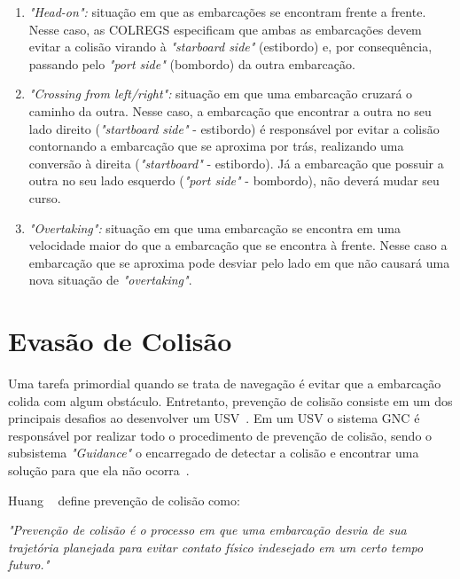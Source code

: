         \begin{enumerate}
            \item \textit{"Head-on":} situação em que as embarcações se encontram frente a frente. Nesse caso, as COLREGS especificam que ambas as embarcações devem evitar a colisão virando à \textit{"starboard side"} (estibordo) e, por consequência, passando pelo \textit{"port side"} (bombordo) da outra embarcação.
            
            \item \textit{"Crossing from left/right":} situação em que uma embarcação cruzará o caminho da outra. Nesse caso, a embarcação que encontrar a outra no seu lado direito (\textit{"startboard side"} - estibordo) é responsável por evitar a colisão contornando a embarcação que se aproxima por trás, realizando uma conversão à direita (\textit{"startboard"} - estibordo). Já a embarcação que possuir a outra no seu lado esquerdo (\textit{"port side"} - bombordo), não deverá mudar seu curso.
            
            \item \textit{"Overtaking":} situação em que uma embarcação se encontra em uma velocidade maior do que a embarcação que se encontra à frente. Nesse caso a embarcação que se aproxima pode desviar pelo lado em que não causará uma nova situação de \textit{"overtaking"}.
        \end{enumerate}
    
    \section{Evasão de Colisão}\label{subchap2:prev_col}
        Uma tarefa primordial quando se trata de navegação é evitar que a embarcação colida com algum obstáculo. Entretanto, prevenção de colisão consiste em um dos principais desafios ao desenvolver um USV~\cite{JURAK2020}. Em um USV o sistema GNC é responsável por realizar todo o procedimento de prevenção de colisão, sendo o subsistema \textit{"Guidance"} o encarregado de detectar a colisão e encontrar uma solução para que ela não ocorra~\cite{HUANG2020451}.
        
        Huang \etal~\cite[p.451]{HUANG2020451} define prevenção de colisão como:
        \begin{directcite}
            \textit{"Prevenção de colisão é o processo em que uma embarcação desvia de sua trajetória planejada para evitar contato físico indesejado em um certo tempo futuro."}
        \end{directcite}
        

